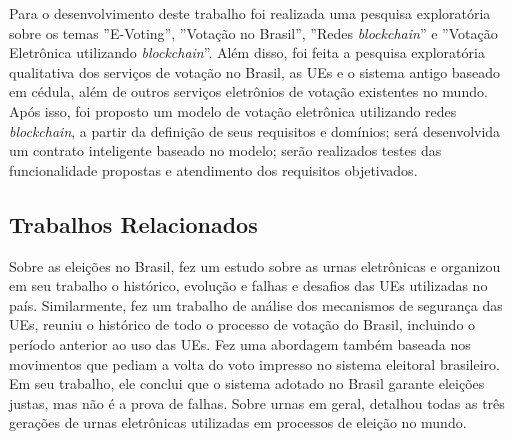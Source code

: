 \documentclass[portuguese]{textolivre}
\begin{document}
	Para o desenvolvimento deste trabalho foi realizada uma pesquisa exploratória sobre os temas ''E-Voting'', ''Votação no Brasil'', ''Redes \emph{blockchain}'' e ''Votação Eletrônica utilizando \emph{blockchain}''. Além disso, foi feita a pesquisa exploratória qualitativa dos serviços de votação no Brasil, as UEs e o sistema antigo baseado em cédula, além de outros serviços eletrônios de votação existentes no mundo. Após isso, foi proposto um modelo de votação eletrônica utilizando redes \emph{blockchain}, a partir da definição de seus requisitos e domínios; será desenvolvida um contrato inteligente baseado no modelo; serão realizados testes das funcionalidade propostas e atendimento dos requisitos objetivados.
	
	
	
	\subsection{Trabalhos Relacionados \label{trabalhosRelacionados}}
	
	Sobre as eleições no Brasil, \textcite{ferrao2019urnas} fez um estudo sobre as urnas eletrônicas e organizou em seu trabalho o histórico, evolução e falhas e desafios das UEs utilizadas no país. Similarmente, \textcite{machado2021vulnerabilidade} fez um trabalho de análise dos mecanismos de segurança das UEs, reuniu o histórico de todo o processo de votação do Brasil, incluindo o período anterior ao uso das UEs. Fez uma abordagem também baseada nos movimentos que pediam a volta do voto impresso no sistema eleitoral brasileiro. Em seu trabalho, ele conclui que o sistema adotado no Brasil garante eleições justas, mas não é a prova de falhas. Sobre urnas em geral, \textcite{brunazo2016modelos} detalhou todas as três gerações de urnas eletrônicas utilizadas em processos de eleição no mundo. 
	
\end{document}
